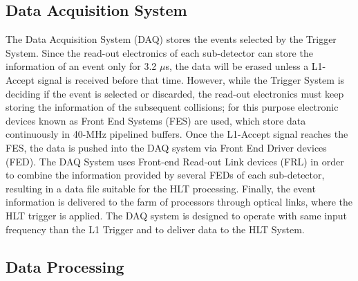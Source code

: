 \subsection{Data Acquisition System}
\label{subsec:Trigger}

\noindent The Data Acquisition System (DAQ) stores the events selected by the Trigger System. Since 
the read-out electronics of each sub-detector can store the information of an event 
only for 3.2 $\mu$s, the data will be erased unless a L1-Accept signal is received before 
that time. However, while the Trigger System is deciding if the event is selected or discarded, the 
read-out electronics must keep storing the information of the subsequent collisions; for 
this purpose electronic devices known as Front End Systems (FES) are used, which store data continuously 
in 40-MHz pipelined buffers. Once the L1-Accept signal reaches the FES, the 
data is pushed into the DAQ system via Front End Driver devices (FED). The DAQ System
uses Front-end Read-out Link devices (FRL) in order to combine the information provided 
by several FEDs of each sub-detector, resulting in a data file suitable for the HLT processing. Finally,
the event information is delivered to the farm of processors through optical links, where the HLT
trigger is applied. The DAQ system is designed to operate with same input frequency 
than the L1 Trigger and to deliver data to the HLT System.


  


\subsection{Data Processing}
\label{chap2:dataprocessing}

